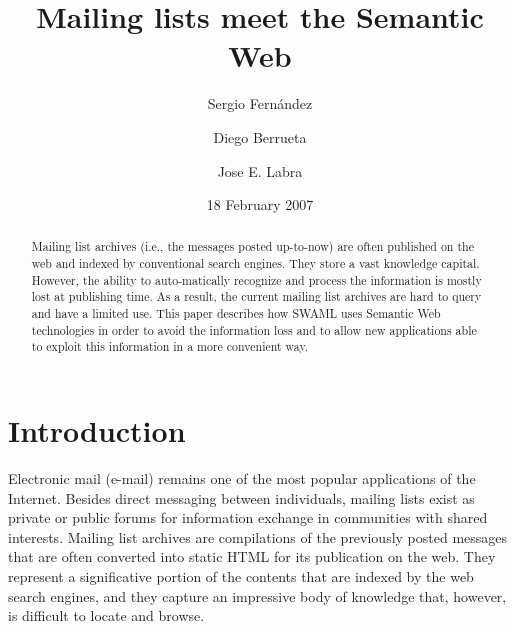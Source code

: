 \documentclass{llncs}
\begin{document}
\title{Mailing lists meet the Semantic Web}


\author{
Sergio Fern\'andez \and Diego Berrueta \and Jose E. Labra
}




\date{18 February 2007}

\maketitle

\begin{abstract}

Mailing list archives (i.e., the messages posted up-to-now) are often published 
on the web and indexed by conventional search engines. They store a vast 
knowledge capital. However, the ability to auto-matically recognize and process 
the information is mostly lost at publishing time. As a result, the current 
mailing list archives are hard to query and have a limited use. This paper 
describes how SWAML uses Semantic Web technologies in order to avoid the
information loss and to allow new applications able to exploit this 
information in a more convenient way.

\end{abstract}

\section{Introduction}

Electronic mail (e-mail) remains one of the most
popular applications of the Internet. Besides direct messaging
between individuals, mailing lists exist as private or public
forums for information exchange in communities with shared interests.
Mailing list archives are compilations of the previously posted
messages that are often converted into static HTML for its
publication on the web. They represent a significative portion of
the contents that are indexed by the web search engines, and they
capture an impressive body of knowledge that, however, is difficult
to locate and browse.
\end{document}
